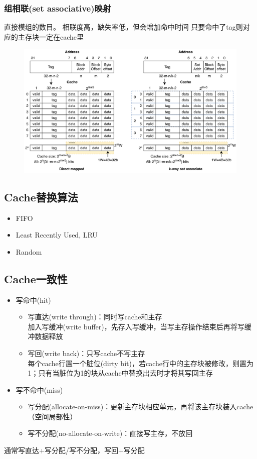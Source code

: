 \subsubsection{组相联(set associative)映射}
直接模组的数目。
相联度高，缺失率低，但会增加命中时间
只要命中了tag则对应的主存块一定在cache里
\begin{figure}[H]
\centering
\includegraphics[width=0.8\linewidth]{fig/Cache-combine.pdf}
\end{figure}

\subsection{Cache替换算法}
\begin{itemize}
	\item FIFO
	\item Least Recently Used, LRU
	\item Random
\end{itemize}

\subsection{Cache一致性}
\begin{itemize}
	\item 写命中(hit)
	\begin{itemize}
		\item 写直达(write through)：同时写cache和主存\\
		加入写缓冲(write buffer)，先存入写缓冲，当写主存操作结束后再将写缓冲数据释放
		\item 写回(write back)：只写cache不写主存\\
		每个cache行置一个脏位(dirty bit)，若cache行中的主存块被修改，则置为1；只有当脏位为1的块从cache中替换出去时才将其写回主存
	\end{itemize}
	\item 写不命中(miss)
	\begin{itemize}
		\item 写分配(allocate-on-miss)：更新主存块相应单元，再将该主存块装入cache（空间局部性）
		\item 写不分配(no-allocate-on-write)：直接写主存，不放回
	\end{itemize}
\end{itemize}
通常写直达+写分配/写不分配，写回+写分配

